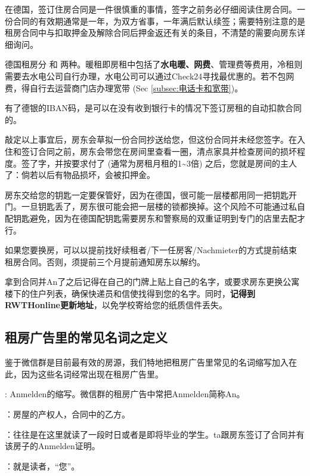     在德国，签订住房合同是一件很慎重的事情，签字之前务必仔细阅读住房合同。一份合同的有效期通常是一年，为双方省事，一年满后默认续签；需要特别注意的是租房合同中与扣取押金及解除合同后押金返还有关的条目，不清楚的需要向房东详细询问。

    德国租房分 和 两种。暖租即房租中包括了\textbf{水电暖、网费}、管理费等费用，冷租则需要去水电公司自行办理，水电公司可以通过Check24寻找最优惠的。若不包网费，得自行去运营商门店办理宽带 (Sec \ref{subsec:电话卡和宽带})。

    有了德银的IBAN码，是可以在没有收到银行卡的情况下签订房租的自动扣款合同的。

    敲定以上事宜后，房东会草拟一份合同抄送给您，但这份合同并未经您签字。在入住和签订合同之前，房东会带您在房间里查看一圈，清点家具并检查房间的损坏程度。签了字，并按要求付了 (通常为房租月租的1\textasciitilde3倍) 之后，您就是房间的主人了：倘若以后有物品损坏，会被扣押金。

    房东交给您的钥匙一定要保管好，因为在德国，很可能一层楼都用同一把钥匙开门。一旦钥匙丢了，房东很可能会把一层楼的锁都换掉。这个风险不可能通过私自配钥匙避免，因为在德国配钥匙需要房东和警察局的双重证明到专门的店里去配才行。

    如果您要换房，可以以提前找好续租者/下一任房客/Nachmieter的方式提前结束租房合同。否则，须提前三个月提前通知房东以解约。

    拿到合同并An了之后记得在自己的门牌上贴上自己的名字，或要求房东更换公寓楼下的住户列表，确保快递员和信使找得到您的名字。同时，\textbf{记得到RWTHonline更新地址}，以免学校寄给您的纸质信件丢失。

  \subsection{租房广告里的常见名词之定义}\label{subsec:租房广告里的常见名词之定义}

    鉴于微信群是目前最有效的房源，我们特地把租房广告里常见的名词缩写加入在此，因为这些名词经常出现在租房广告里。

    : Anmelden的缩写。微信群的租房广告中常把Anmelden简称An。

    ：房屋的产权人，合同中的乙方。

    ：往往是在这里就读了一段时日或者是即将毕业的学生。ta跟房东签订了合同并有该房子的Anmelden证明。

    ：就是读者，``您''。

